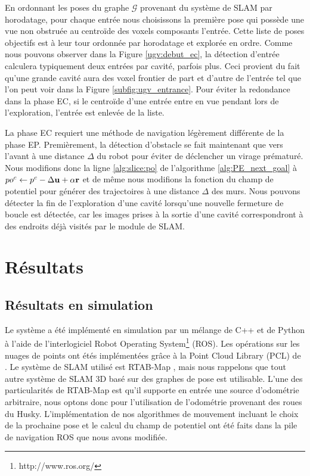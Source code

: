 En ordonnant les poses du graphe $\mathcal G$ provenant du système de SLAM par horodatage, pour chaque entrée nous choisissons la première pose qui possède une vue non obstruée au centroïde des voxels composants l'entrée. Cette liste de poses objectifs est à leur tour ordonnée par horodatage et explorée en ordre. Comme nous pouvons observer dans la Figure \ref{ugv:debut_ec}, la détection d'entrée calculera typiquement deux entrées par cavité, parfois plus. Ceci provient du fait qu’une grande cavité aura des voxel frontier de part et d'autre de l'entrée tel que l'on peut voir dans la Figure \ref{subfig:ugv_entrance}.  Pour éviter la redondance dans la phase EC, si le centroïde d'une entrée entre en vue pendant lors de l'exploration, l'entrée est enlevée de la liste.

La phase EC requiert une méthode de navigation légèrement différente de la phase EP. Premièrement, la détection d'obstacle se fait maintenant que vers l'avant à une distance $\Delta$ du robot pour éviter de déclencher un virage prématuré. Nous modifions donc la ligne \ref{alg:slice:po} de l'algorithme \ref{alg:PE_next_goal} à ${po^c} \gets p^c - \Delta \mathbf{u} + \alpha \mathbf{r}$ et de même nous modifions la fonction du champ de potentiel pour générer des trajectoires à une distance $\Delta$ des murs. Nous pouvons détecter la fin de l'exploration d'une cavité lorsqu'une nouvelle fermeture de boucle est détectée, car les images prises à la sortie d'une cavité correspondront à des endroits déjà visités par le module de SLAM.

\section{Résultats} \label{sec:ugv_results}

\subsection{Résultats en simulation}

Le système a été implémenté en simulation par un mélange de C++ et de Python à l'aide de l'interlogiciel Robot Operating System\footnote{http://www.ros.org/} (ROS). Les opérations sur les nuages de points ont étés implémentées grâce à la Point Cloud Library (PCL) de \citep{Rusu2011}. Le système de SLAM utilisé est RTAB-Map \citep{Labbe2014}, mais nous rappelons que tout autre système de SLAM 3D basé sur des graphes de pose est utilisable. L'une des particularités de RTAB-Map est qu'il supporte en entrée une source d'odométrie arbitraire, nous optons donc pour l'utilisation de l'odométrie provenant des roues du Husky. L'implémentation de nos algorithmes de mouvement incluant le choix de la prochaine pose et le calcul du champ de potentiel ont été faits dans la pile de navigation ROS \citep{Mader2010} que nous avons modifiée.

